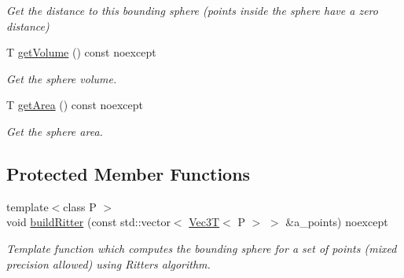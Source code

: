 \begin{DoxyCompactItemize}
\begin{DoxyCompactList}\small\item\em Get the distance to this bounding sphere (points inside the sphere have a zero distance) \end{DoxyCompactList}\item 
T \hyperlink{classBoundingVolumes_1_1BoundingSphereT_a44e0069495c19069fced07aab8e614c6}{get\+Volume} () const noexcept
\begin{DoxyCompactList}\small\item\em Get the sphere volume. \end{DoxyCompactList}\item 
T \hyperlink{classBoundingVolumes_1_1BoundingSphereT_a303fd50d1b8d27c7014c50ba0867a0b3}{get\+Area} () const noexcept
\begin{DoxyCompactList}\small\item\em Get the sphere area. \end{DoxyCompactList}\end{DoxyCompactItemize}
\subsection*{Protected Member Functions}
\begin{DoxyCompactItemize}
\item 
\mbox{\label{classBoundingVolumes_1_1BoundingSphereT_abea0326be2d1843f3ad7c6de1ebe2418}} 
{\footnotesize template$<$class P $>$ }\\void \hyperlink{classBoundingVolumes_1_1BoundingSphereT_abea0326be2d1843f3ad7c6de1ebe2418}{build\+Ritter} (const std\+::vector$<$ \hyperlink{classVec3T}{Vec3T}$<$ P $>$ $>$ \&a\+\_\+points) noexcept
\begin{DoxyCompactList}\small\item\em Template function which computes the bounding sphere for a set of points (mixed precision allowed) using Ritter\textquotesingle{}s algorithm. \end{DoxyCompactList}\end{DoxyCompactItemize}
